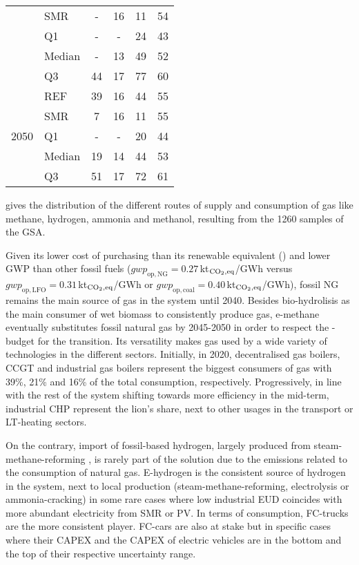 \begin{table}[htbp!]
\begin{minipage}{\linewidth}
\begin{tabular}{l l | c c c c}
 & SMR & - & 16 & 11 & 54\\
 \cmidrule{2 - 6}
 & Q1 & - & - & 24 & 43\\
 & Median & - & 13 & 49 & 52\\
 & Q3 & 44 & 17 & 77 & 60\\
\toprule
\multirow{5}{*}{2050}
 & REF & 39 & 16 & 44 & 55\\
 & SMR & 7 & 16 & 11 & 55\\
 \cmidrule{2 - 6}
 & Q1 & - & - & 20 & 44\\
 & Median & 19 & 14 & 44 & 53\\
 & Q3 & 51 & 17 & 72 & 61\\
\bottomrule							
\end{tabular}
\end{minipage}
\end{table}

 gives the distribution of the different routes of supply and consumption of gas like methane, hydrogen, ammonia and methanol, resulting from the 1260 samples of the \gls{GSA}.

Given its lower cost of purchasing than its renewable equivalent () and lower \gls{GWP} than other fossil fuels (\ie $\mathit{gwp}_{\mathrm{op,NG}}=0.27$\,kt$_{\ce{CO2},\text{eq}}$/GWh versus $\mathit{gwp}_{\mathrm{op,LFO}}=0.31$\,kt$_{\ce{CO2},\text{eq}}$/GWh or $\mathit{gwp}_{\mathrm{op,coal}}=0.40$\,kt$_{\ce{CO2},\text{eq}}$/GWh), fossil \gls{NG} remains the main source of gas in the system until 2040. Besides bio-hydrolisis as the main consumer of wet biomass to consistently produce gas, e-methane eventually substitutes fossil natural gas by 2045-2050 in order to respect the -budget for the transition. Its versatility makes gas used by a wide variety of technologies in the different sectors. Initially, in 2020, decentralised gas boilers, \gls{CCGT} and industrial gas boilers represent the biggest consumers of gas with 39\%, 21\% and 16\% of the total consumption, respectively. Progressively, in line with the rest of the system shifting towards more efficiency in the mid-term, industrial \gls{CHP} represent the lion's share, next to other usages in the transport or \gls{LT}-heating sectors.

On the contrary, import of fossil-based hydrogen, largely produced from steam-methane-reforming \cite{spf_economie_h2}, is rarely part of the solution due to the emissions related to the consumption of natural gas. E-hydrogen is the consistent source of hydrogen in the system, next to local production (\ie steam-methane-reforming, electrolysis or ammonia-cracking) in some rare cases where low industrial \gls{EUD} coincides with more abundant electricity from \gls{SMR} or \gls{PV}. In terms of consumption, \gls{FC}-trucks are the more consistent player. \gls{FC}-cars are also at stake but in specific cases where their CAPEX and the CAPEX of electric vehicles are in the bottom and the top of their respective uncertainty range.

